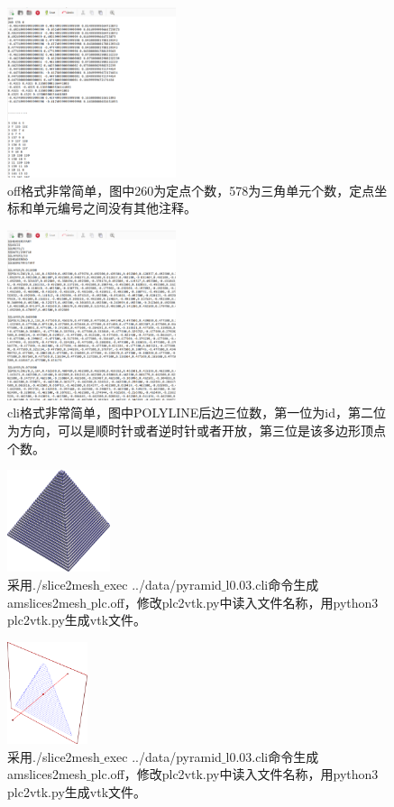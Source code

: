 \begin{figure}[!htbp]
  \centering
  \includegraphics[height=5cm]{fig/1/1.1.7.1:0.png}
  \caption{off格式非常简单，图中260为定点个数，578为三角单元个数，定点坐标和单元编号之间没有其他注释。}
  \label{fig:1-7}
\end{figure}

\begin{figure}[!htbp]
  \centering
  \includegraphics[height=5cm]{fig/1/1.1.7.1:00.png}
  \caption{cli格式非常简单，图中POLYLINE后边三位数，第一位为id，第二位为方向，可以是顺时针或者逆时针或者开放，第三位是该多边形顶点个数。}
  \label{fig:1-7}
\end{figure}

\begin{figure}[!htbp]
  \centering
  \includegraphics[height=3cm]{fig/1/1.1.7.1:1.png}
  \caption{采用./slice2mesh$\_$exec ../data/pyramid$\_$l0.03.cli命令生成amslices2mesh$\_$plc.off，修改plc2vtk.py中读入文件名称，用python3 plc2vtk.py生成vtk文件。}
  \label{fig:1-7}
\end{figure}

\begin{figure}[!htbp]
  \centering
  \includegraphics[height=3cm]{fig/1/1.1.7.1:2.png}
  \caption{采用./slice2mesh$\_$exec ../data/pyramid$\_$l0.03.cli命令生成amslices2mesh$\_$plc.off，修改plc2vtk.py中读入文件名称，用python3 plc2vtk.py生成vtk文件。}
  \label{fig:1-7}
\end{figure}

